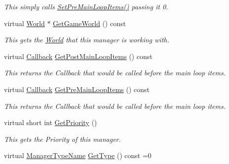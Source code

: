 \begin{DoxyCompactItemize}
\begin{DoxyCompactList}\small\item\em This simply calls \hyperlink{classMezzanine_1_1ManagerBase_a84dd669c15e9db08c9efbc84c4fa3b0b}{SetPreMainLoopItems()} passing it 0. \item\end{DoxyCompactList}\item 
virtual \hyperlink{classMezzanine_1_1World}{World} $\ast$ \hyperlink{classMezzanine_1_1ManagerBase_a47a85b5bfb2046b364d38adf805bea7d}{GetGameWorld} () const 
\begin{DoxyCompactList}\small\item\em This gets the \hyperlink{classMezzanine_1_1World}{World} that this manager is working with. \item\end{DoxyCompactList}\item 
virtual \hyperlink{classMezzanine_1_1ManagerBase_ab23a9aa27c4e3cb58d902a149d3c6de2}{Callback} \hyperlink{classMezzanine_1_1ManagerBase_aa02a9788d7a83de123083ce3bfdcef4b}{GetPostMainLoopItems} () const 
\begin{DoxyCompactList}\small\item\em This returns the Callback that would be called before the main loop items. \item\end{DoxyCompactList}\item 
virtual \hyperlink{classMezzanine_1_1ManagerBase_ab23a9aa27c4e3cb58d902a149d3c6de2}{Callback} \hyperlink{classMezzanine_1_1ManagerBase_af1ede605b127aeb1a96e226284c318ce}{GetPreMainLoopItems} () const 
\begin{DoxyCompactList}\small\item\em This returns the Callback that would be called before the main loop items. \item\end{DoxyCompactList}\item 
virtual short int \hyperlink{classMezzanine_1_1ManagerBase_a9acb88dc379867430e76d328028862f0}{GetPriority} ()
\begin{DoxyCompactList}\small\item\em This gets the Priority of this manager. \item\end{DoxyCompactList}\item 
virtual \hyperlink{classMezzanine_1_1ManagerBase_a08cecf5169cad3e82be81a3a159b0b6e}{ManagerTypeName} \hyperlink{classMezzanine_1_1ManagerBase_a6fbfe9e847156915b195b6de1cf76973}{GetType} () const =0

\end{DoxyCompactItemize}
